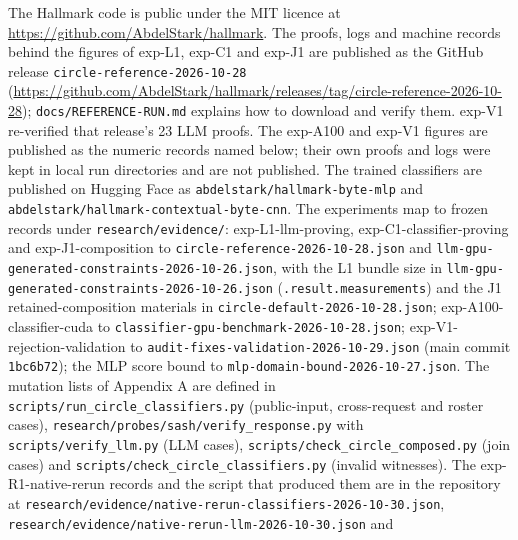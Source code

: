 \documentclass[11pt]{article}
\begin{document}
The Hallmark code is public under the MIT licence at \url{https://github.com/AbdelStark/hallmark}. The proofs, logs and machine records behind the figures of exp-L1, exp-C1 and exp-J1 are published as the GitHub release \texttt{circle-\allowbreak{}reference-\allowbreak{}2026-\allowbreak{}10-\allowbreak{}28} (\url{https://github.com/AbdelStark/hallmark/releases/tag/circle-reference-2026-10-28}); \texttt{docs/\allowbreak{}REFERENCE-\allowbreak{}RUN.\allowbreak{}md} explains how to download and verify them. exp-V1 re-verified that release's 23 LLM proofs. The exp-A100 and exp-V1 figures are published as the numeric records named below; their own proofs and logs were kept in local run directories and are not published. The trained classifiers are published on Hugging Face as \texttt{abdelstark/\allowbreak{}hallmark-\allowbreak{}byte-\allowbreak{}mlp} and \texttt{abdelstark/\allowbreak{}hallmark-\allowbreak{}contextual-\allowbreak{}byte-\allowbreak{}cnn}. The experiments map to frozen records under \texttt{research/\allowbreak{}evidence/\allowbreak{}}: exp-L1-llm-proving, exp-C1-classifier-proving and exp-J1-composition to \texttt{circle-\allowbreak{}reference-\allowbreak{}2026-\allowbreak{}10-\allowbreak{}28.\allowbreak{}json} and \texttt{llm-\allowbreak{}gpu-\allowbreak{}generated-\allowbreak{}constraints-\allowbreak{}2026-\allowbreak{}10-\allowbreak{}26.\allowbreak{}json}, with the L1 bundle size in \texttt{llm-\allowbreak{}gpu-\allowbreak{}generated-\allowbreak{}constraints-\allowbreak{}2026-\allowbreak{}10-\allowbreak{}26.\allowbreak{}json} (\texttt{.\allowbreak{}result.\allowbreak{}measurements}) and the J1 retained-composition materials in \texttt{circle-\allowbreak{}default-\allowbreak{}2026-\allowbreak{}10-\allowbreak{}28.\allowbreak{}json}; exp-A100-classifier-cuda to \texttt{classifier-\allowbreak{}gpu-\allowbreak{}benchmark-\allowbreak{}2026-\allowbreak{}10-\allowbreak{}28.\allowbreak{}json}; exp-V1-rejection-validation to \texttt{audit-\allowbreak{}fixes-\allowbreak{}validation-\allowbreak{}2026-\allowbreak{}10-\allowbreak{}29.\allowbreak{}json} (main commit \texttt{1bc6b72}); the MLP score bound to \texttt{mlp-\allowbreak{}domain-\allowbreak{}bound-\allowbreak{}2026-\allowbreak{}10-\allowbreak{}27.\allowbreak{}json}. The mutation lists of Appendix A are defined in \texttt{scripts/\allowbreak{}run\_\allowbreak{}circle\_\allowbreak{}classifiers.\allowbreak{}py} (public-input, cross-request and roster cases), \texttt{research/\allowbreak{}probes/\allowbreak{}sash/\allowbreak{}verify\_\allowbreak{}response.\allowbreak{}py} with \texttt{scripts/\allowbreak{}verify\_llm.\allowbreak{}py} (LLM cases), \texttt{scripts/\allowbreak{}check\_\allowbreak{}circle\_\allowbreak{}composed.\allowbreak{}py} (join cases) and \texttt{scripts/\allowbreak{}check\_\allowbreak{}circle\_\allowbreak{}classifiers.\allowbreak{}py} (invalid witnesses). The exp-R1-native-rerun records and the script that produced them are in the repository at \texttt{research/\allowbreak{}evidence/\allowbreak{}native-\allowbreak{}rerun-\allowbreak{}classifiers-\allowbreak{}2026-\allowbreak{}10-\allowbreak{}30.\allowbreak{}json}, \texttt{research/\allowbreak{}evidence/\allowbreak{}native-\allowbreak{}rerun-\allowbreak{}llm-\allowbreak{}2026-\allowbreak{}10-\allowbreak{}30.\allowbreak{}json} and 
\end{document}
